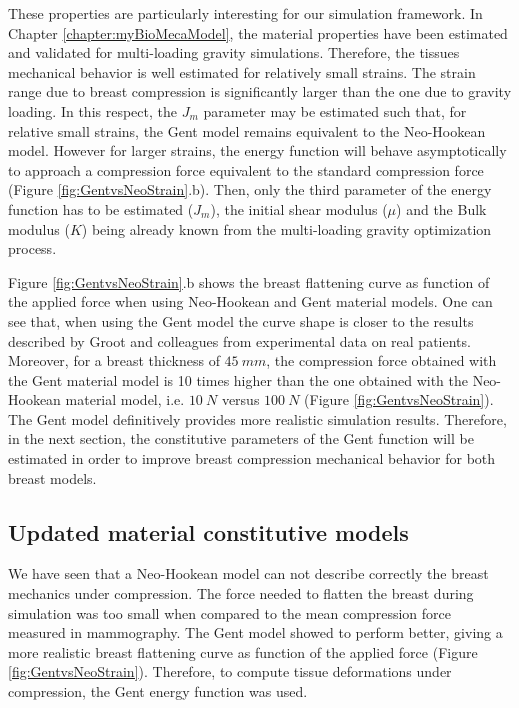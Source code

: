 These properties are particularly interesting for our simulation framework. In Chapter \ref{chapter:myBioMecaModel}, the material properties have been estimated and validated for multi-loading gravity simulations. Therefore, the tissues mechanical behavior is well estimated for relatively small strains. The strain range due to breast compression is significantly larger than the one due to gravity loading. In this respect, the $J_m$ parameter may be estimated such that, for relative small strains, the Gent model remains equivalent to the Neo-Hookean model. However for larger strains,  the energy function will behave asymptotically to approach a compression force equivalent to the standard compression force (Figure \ref{fig:GentvsNeoStrain}.b). Then, only the third parameter of the energy function has to be estimated ($J_m$), the initial shear modulus ($\mu$) and the Bulk modulus ($K$) being already known from the multi-loading gravity optimization process.

Figure \ref{fig:GentvsNeoStrain}.b shows the breast flattening curve as function of the applied force when using Neo-Hookean and Gent material models. One can see that, when using the Gent model the curve shape is closer to the results described by Groot and colleagues \citep{de_pain_2015} from experimental data on real patients. Moreover, for a breast thickness of $45 \ mm$, the compression force obtained with the Gent material model is 10 times higher than the one obtained with the Neo-Hookean material model, i.e. $10 \ N$ versus $100 \ N$ (Figure \ref{fig:GentvsNeoStrain}). The Gent model definitively provides more realistic simulation results. Therefore, in the next section, the constitutive parameters of the Gent function will be estimated in order to improve breast compression mechanical behavior for both breast models. 


\subsection{Updated material constitutive models}
We have seen that a Neo-Hookean model can not describe correctly the breast mechanics under compression. The force needed to flatten the breast during simulation was too small when compared to the mean compression force measured in mammography. 
The Gent model showed to perform better, giving a more realistic breast flattening curve as function of the applied force (Figure \ref{fig:GentvsNeoStrain}). Therefore, to compute tissue deformations under compression, the Gent energy function was used. 


